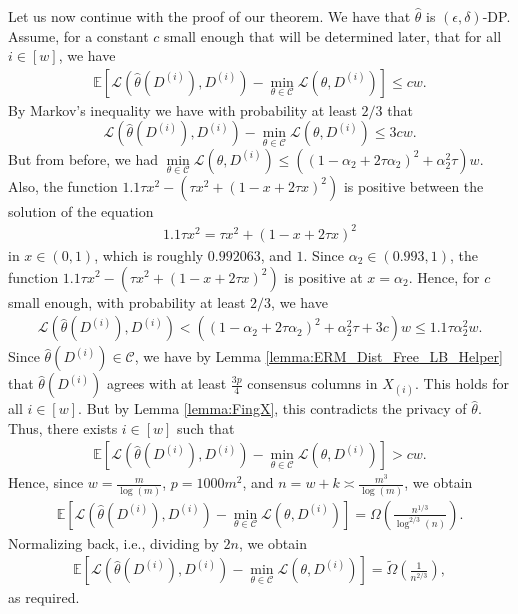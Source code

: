 \documentclass{article}
\begin{document}
Let us now continue with the proof of our theorem. We have that $\hat{\theta}$ is $(\epsilon, \delta)$-DP. Assume, for a constant $c$ small enough that will be determined later, that for all $i \in [w]$, we have
\begin{align*}
\mathbb{E}\left[\mathcal{L}\left(\hat{\theta}(D^{(i)}), D^{(i)}\right) - \mathop{\min}\limits_{\theta \in \mathcal{C}}\mathcal{L}\left(\theta, D^{(i)}\right)\right] \leq cw.
\end{align*}
By Markov's inequality we have with probability at least $2/3$ that
$$\mathcal{L}\left(\hat{\theta}(D^{(i)}), D^{(i)}\right) - \mathop{\min}\limits_{\theta \in \mathcal{C}}\mathcal{L}\left(\theta, D^{(i)}\right) \leq 3cw.
$$
But from before, we had $\mathop{\min}\limits_{\theta \in \mathcal{C}}\mathcal{L}\left(\theta, D^{(i)}\right) \leq \left((1 - \alpha_2 + 2\tau \alpha_2)^2 + \alpha_2^2 \tau \right)w$. Also, the function $1.1\tau x^2 - \left(\tau x^2 + (1 - x + 2\tau x)^2\right)$ is positive between the solution of the equation
\begin{align*}
1.1\tau x^2 = \tau x^2 + (1 - x + 2\tau x)^2
\end{align*}
in $x \in (0, 1)$, which is roughly $0.992063$, and $1$. Since $\alpha_2 \in (0.993, 1)$, the function $1.1\tau x^2 - \left(\tau x^2 + (1 - x + 2\tau x)^2\right)$ is positive at $x = \alpha_2$. Hence, for $c$ small enough, with probability at least $2/3$, we have
\begin{align*}
\mathcal{L}\left(\hat{\theta}(D^{(i)}), D^{(i)}\right) < \left((1 - \alpha_2 + 2\tau \alpha_2)^2 + \alpha_2^2 \tau + 3c \right)w \leq 1.1\tau \alpha_2^2w.
\end{align*}
Since $\hat{\theta}(D^{(i)}) \in \mathcal{C}$, we have by Lemma \ref{lemma:ERM_Dist_Free_LB_Helper} that $\hat{\theta}(D^{(i)})$ agrees with at least $\frac{3p}{4}$ consensus columns in $X_{(i)}$. This holds for all $i \in [w]$. But by Lemma \ref{lemma:FingX}, this contradicts the privacy of $\hat{\theta}$. Thus, there exists $i \in [w]$ such that 
\begin{align*}
\mathbb{E}\left[\mathcal{L}\left(\hat{\theta}(D^{(i)}), D^{(i)}\right) - \mathop{\min}\limits_{\theta \in \mathcal{C}}\mathcal{L}\left(\theta, D^{(i)}\right)\right] > cw.
\end{align*}
Hence, since $w = \frac{m}{\log(m)}$, $p = 1000m^2$, and $n = w + k \asymp \frac{m^3}{\log(m)}$, we obtain
\begin{align*}
\mathbb{E}\left[\mathcal{L}\left(\hat{\theta}(D^{(i)}), D^{(i)}\right) - \mathop{\min}\limits_{\theta \in \mathcal{C}}\mathcal{L}\left(\theta, D^{(i)}\right)\right] = \Omega\left(\frac{n^{1/3}}{\log^{2/3}(n)}\right).
\end{align*}
Normalizing back, i.e., dividing by $2n$, we obtain
\begin{align*}
\mathbb{E}\left[\mathcal{L}\left(\hat{\theta}(D^{(i)}), D^{(i)}\right) - \mathop{\min}\limits_{\theta \in \mathcal{C}}\mathcal{L}\left(\theta, D^{(i)}\right)\right] = \widetilde{\Omega}\left(\frac{1}{n^{2/3}}\right),
\end{align*}
as required.
\end{document}
